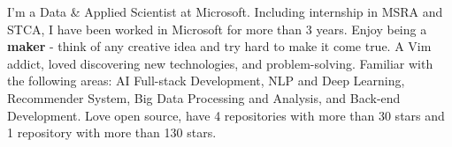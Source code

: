 

\begin{cvparagraph}

I'm a Data \& Applied Scientist at Microsoft. Including internship in MSRA and STCA, I have been worked in Microsoft for more than 3 years.
Enjoy being a \textbf{maker} - think of any creative idea and try hard to make it come true. A Vim addict, loved discovering new technologies, and problem-solving.
Familiar with the following areas: AI Full-stack Development, NLP and Deep Learning, Recommender System, Big Data Processing and Analysis, and Back-end Development.
Love open source, have 4 repositories with more than 30 stars and 1 repository with more than 130 stars.

\end{cvparagraph}
